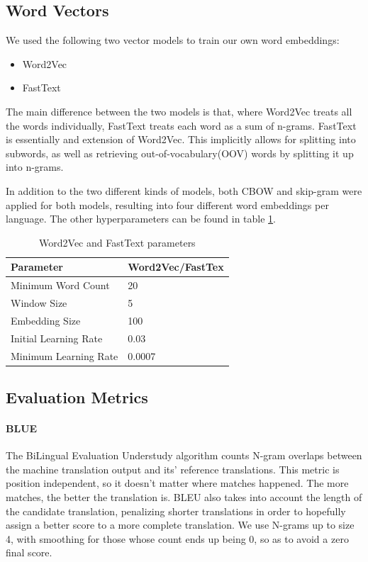 \documentclass{article}
\begin{document}
\subsection*{Word Vectors}

We used the following two vector models to train our own word embeddings:

\begin{itemize}
  \item Word2Vec
  \item FastText
\end{itemize}

The main difference between the two models is that, where Word2Vec treats all the words individually, FastText treats each word as a sum of n-grams. FastText is essentially and extension of Word2Vec. This implicitly allows for splitting into subwords, as well as retrieving out-of-vocabulary(OOV) words by splitting it up into n-grams.

In addition to the two different kinds of models, both CBOW and skip-gram were applied for both models, resulting into four different word embeddings per language. The other hyperparameters can be found in table \ref{tb:embedding_params}.

\begin{table}[H]
  \begin{center}
    \begin{tabular}{p{4cm}|p{4cm}}
        \textbf{Parameter}& \textbf{Word2Vec/FastTex}\\
        \hline
        Minimum Word Count      & 20        \\
        Window Size             & 5         \\
        Embedding Size          & 100       \\
        Initial Learning Rate   & 0.03      \\
        Minimum Learning Rate   & 0.0007    \\
    \end{tabular}
    \caption{Word2Vec and FastText parameters}
    \label{tb:embedding_params}
  \end{center}
\end{table}

\subsection*{Evaluation Metrics}

\paragraph{BLUE} The BiLingual Evaluation Understudy algorithm \cite{Papineni2002} counts N-gram overlaps between the machine translation output and its' reference translations. This metric is position independent, so it doesn't matter where matches happened. The more matches, the better the translation is. BLEU also takes into account the length of the candidate translation, penalizing shorter translations in order to hopefully assign a better score to a more complete translation. We use N-grams up to size 4, with smoothing for those whose count ends up being 0, so as to avoid a zero final score.
\end{document}
